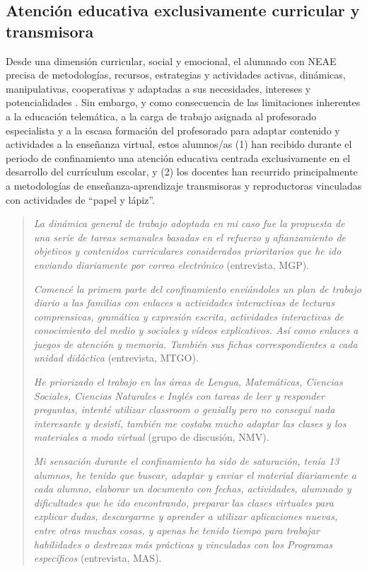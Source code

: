 \documentclass{textolivre}
\begin{document}
\subsection{Atención educativa exclusivamente curricular y transmisora}
Desde una dimensión curricular, social y emocional, el alumnado con NEAE precisa de metodologías, recursos, estrategias y actividades activas, dinámicas, manipulativas, cooperativas y adaptadas a sus necesidades, intereses y potencialidades \cite{gonzalez2020}. %
Sin embargo, y como consecuencia de las limitaciones inherentes a la educación telemática, a la carga de trabajo asignada al profesorado especialista y a la escasa formación del profesorado para adaptar contenido y actividades a la enseñanza virtual, estos alumnos/as (1) han recibido durante el periodo de confinamiento una atención educativa centrada exclusivamente en el desarrollo del currículum escolar, y (2) los docentes han recurrido principalmente a metodologías de enseñanza-aprendizaje transmisoras y reproductoras vinculadas con actividades de “papel y lápiz”.  

\begin{quote}
\emph{La dinámica general de trabajo adoptada en mi caso fue la propuesta de una serie de tareas semanales basadas en el refuerzo y afianzamiento de objetivos y contenidos curriculares considerados prioritarios que he ido enviando diariamente por correo electrónico} (entrevista, MGP).

\emph{Comencé la primera parte del confinamiento enviándoles un plan de trabajo diario a las familias con enlaces a actividades interactivas de lecturas comprensivas, gramática y expresión escrita, actividades interactivas de conocimiento del medio y sociales y vídeos explicativos. Así como enlaces a juegos de atención y memoria. También sus fichas correspondientes a cada unidad didáctica} (entrevista, MTGO).

\emph{He priorizado el trabajo en las áreas de Lengua, Matemáticas, Ciencias Sociales, Ciencias Naturales e Inglés con tareas de leer y responder preguntas, intenté utilizar classroom o genially pero no conseguí nada interesante y desistí, también me costaba mucho adaptar las clases y los materiales a modo virtual} (grupo de discusión, NMV).

\emph{Mi sensación durante el confinamiento ha sido de saturación, tenía 13 alumnos, he tenido que buscar, adaptar y enviar el material diariamente a cada alumno, elaborar un documento con fechas, actividades, alumnado y dificultades que he ido encontrando, preparar las clases virtuales para explicar dudas, descargarme y aprender a utilizar aplicaciones nuevas, entre otras muchas cosas, y apenas he tenido tiempo para trabajar habilidades o destrezas más prácticas y vinculadas con los Programas específicos} (entrevista, MAS). 
\end{quote}
\end{document}
